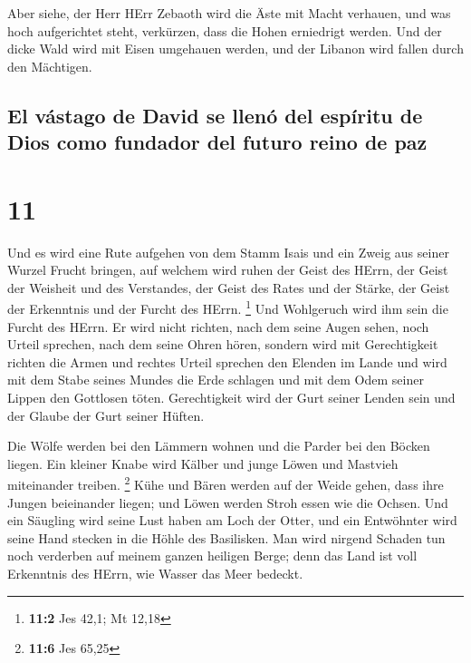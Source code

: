  Aber siehe, der Herr HErr Zebaoth wird die Äste mit
Macht verhauen, und was hoch aufgerichtet steht, verkürzen, dass die
Hohen erniedrigt werden.  Und der dicke Wald wird mit
Eisen umgehauen werden, und der Libanon wird fallen durch den Mächtigen.

\hypertarget{el-vuxe1stago-de-david-se-llenuxf3-del-espuxedritu-de-dios-como-fundador-del-futuro-reino-de-paz}{%
\subsection{El vástago de David se llenó del espíritu de Dios como
fundador del futuro reino de
paz}\label{el-vuxe1stago-de-david-se-llenuxf3-del-espuxedritu-de-dios-como-fundador-del-futuro-reino-de-paz}}

\hypertarget{section-10}{%
\section{11}\label{section-10}}

 Und es wird eine Rute aufgehen von dem Stamm Isais und
ein Zweig aus seiner Wurzel Frucht bringen,  auf welchem
wird ruhen der Geist des HErrn, der Geist der Weisheit und des
Verstandes, der Geist des Rates und der Stärke, der Geist der Erkenntnis
und der Furcht des HErrn. \footnote{\textbf{11:2} Jes 42,1; Mt 12,18}
 Und Wohlgeruch wird ihm sein die Furcht des HErrn. Er
wird nicht richten, nach dem seine Augen sehen, noch Urteil sprechen,
nach dem seine Ohren hören,  sondern wird mit
Gerechtigkeit richten die Armen und rechtes Urteil sprechen den Elenden
im Lande und wird mit dem Stabe seines Mundes die Erde schlagen und mit
dem Odem seiner Lippen den Gottlosen töten.  Gerechtigkeit
wird der Gurt seiner Lenden sein und der Glaube der Gurt seiner Hüften.

 Die Wölfe werden bei den Lämmern wohnen und die Parder
bei den Böcken liegen. Ein kleiner Knabe wird Kälber und junge Löwen und
Mastvieh miteinander treiben. \footnote{\textbf{11:6} Jes 65,25}
 Kühe und Bären werden auf der Weide gehen, dass ihre
Jungen beieinander liegen; und Löwen werden Stroh essen wie die Ochsen.
 Und ein Säugling wird seine Lust haben am Loch der Otter,
und ein Entwöhnter wird seine Hand stecken in die Höhle des Basilisken.
 Man wird nirgend Schaden tun noch verderben auf meinem
ganzen heiligen Berge; denn das Land ist voll Erkenntnis des HErrn, wie
Wasser das Meer bedeckt.

